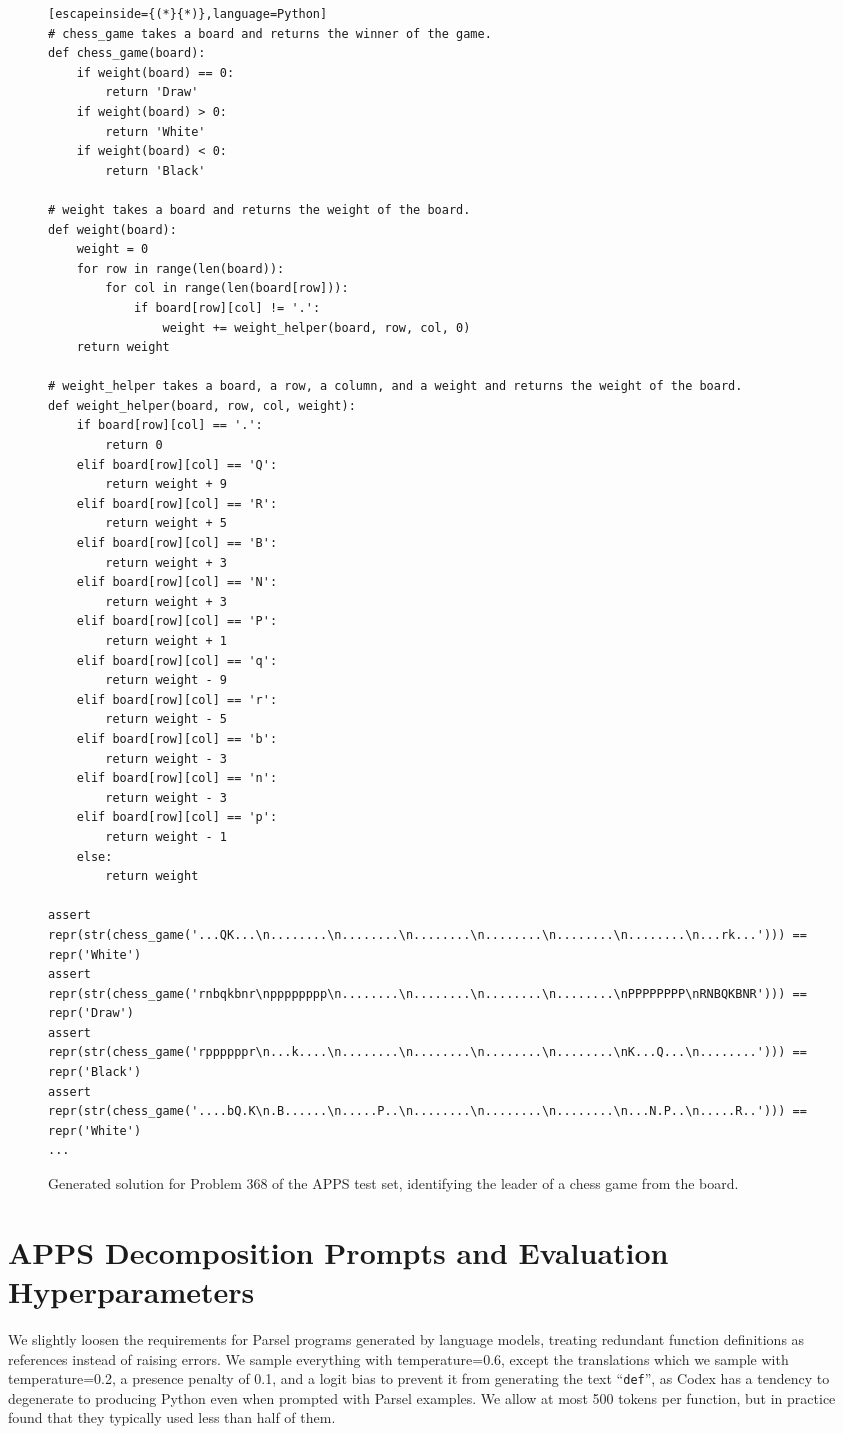 \begin{figure*}[h]
\label{pychess}
\begin{lstlisting}[escapeinside={(*}{*)},language=Python]
# chess_game takes a board and returns the winner of the game.
def chess_game(board):
    if weight(board) == 0:
        return 'Draw'
    if weight(board) > 0:
        return 'White'
    if weight(board) < 0:
        return 'Black'

# weight takes a board and returns the weight of the board.
def weight(board):
	weight = 0
	for row in range(len(board)):
		for col in range(len(board[row])):
			if board[row][col] != '.':
				weight += weight_helper(board, row, col, 0)
	return weight

# weight_helper takes a board, a row, a column, and a weight and returns the weight of the board.
def weight_helper(board, row, col, weight):
    if board[row][col] == '.':
        return 0
    elif board[row][col] == 'Q':
        return weight + 9
    elif board[row][col] == 'R':
        return weight + 5
    elif board[row][col] == 'B':
        return weight + 3
    elif board[row][col] == 'N':
        return weight + 3
    elif board[row][col] == 'P':
        return weight + 1
    elif board[row][col] == 'q':
        return weight - 9
    elif board[row][col] == 'r':
        return weight - 5
    elif board[row][col] == 'b':
        return weight - 3
    elif board[row][col] == 'n':
        return weight - 3
    elif board[row][col] == 'p':
        return weight - 1
    else:
        return weight

assert repr(str(chess_game('...QK...\n........\n........\n........\n........\n........\n........\n...rk...'))) == repr('White')
assert repr(str(chess_game('rnbqkbnr\npppppppp\n........\n........\n........\n........\nPPPPPPPP\nRNBQKBNR'))) == repr('Draw')
assert repr(str(chess_game('rppppppr\n...k....\n........\n........\n........\n........\nK...Q...\n........'))) == repr('Black')
assert repr(str(chess_game('....bQ.K\n.B......\n.....P..\n........\n........\n........\n...N.P..\n.....R..'))) == repr('White')
...
\end{lstlisting}
\caption{Generated solution for Problem 368 of the APPS test set, identifying the leader of a chess game from the board.}
\end{figure*}

\clearpage
\section{APPS Decomposition Prompts and Evaluation Hyperparameters}
\label{decomprompts}
We slightly loosen the requirements for Parsel programs generated by language models, treating redundant function definitions as references instead of raising errors. We sample everything with temperature=0.6, except the translations which we sample with temperature=0.2, a presence penalty of 0.1, and a logit bias to prevent it from generating the text ``\lstinline{def}'', as Codex has a tendency to degenerate to producing Python even when prompted with Parsel examples. We allow at most 500 tokens per function, but in practice found that they typically used less than half of them.

